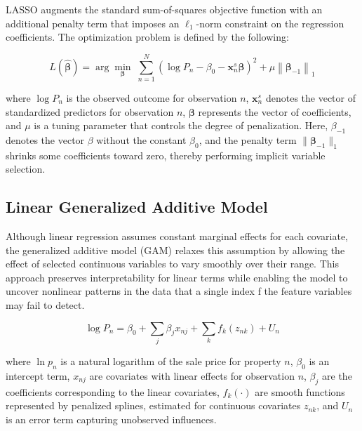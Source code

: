 LASSO augments the standard sum-of-squares objective function with an additional penalty term that imposes an \( \ell_1 \)-norm constraint on the regression coefficients. The optimization problem is defined by the following:

\[
L(\hat{\boldsymbol{\beta}}) = \arg\min_{\boldsymbol\beta}\; \sum_{n=1}^{N} \left( \log P_n - \beta_0 - \mathbf{x}_n^s \boldsymbol \beta \right)^2 + \mu \left\| \boldsymbol\beta_{-1} \right\|_1 
\]

\noindent where \( \log P_n \) is the observed outcome for observation $n$, \( \mathbf{x}_n^s \) denotes the vector of standardized predictors for observation $n$, \( \boldsymbol{\beta} \) represents the vector of coefficients, and \( \mu  \) is a tuning parameter that controls the degree of penalization. Here, $\beta_{-1}$ denotes the vector $\beta$ without the constant $\beta_0$, and the penalty term \( \| \boldsymbol\beta_{-1} \|_1 \) shrinks some coefficients toward zero, thereby performing implicit variable selection. 

\subsection*{Linear Generalized Additive Model}

Although linear regression assumes constant marginal effects for each covariate, the generalized additive model (GAM) relaxes this assumption by allowing the effect of selected continuous variables to vary smoothly over their range. This approach preserves interpretability for linear terms while enabling the model to uncover nonlinear patterns in the data that a single index f the feature variables may fail to detect. 

\[
\log P_n = \beta_0 + \sum_{j} \beta_j x_{nj} + \sum_{k} f_k(z_{nk}) + U_n
\]

\noindent where  \( \ln p_n \) is a natural logarithm of the sale price for property \(n\), \( \beta_0 \) is an intercept term, \( x_{nj} \) are covariates with linear effects for observation \( n \), \( \beta_j \) are the coefficients corresponding to the linear covariates, \( f_k(\cdot) \) are smooth functions represented by penalized splines, estimated for continuous covariates \( z_{nk} \), and \( U_n \) is an error term capturing unobserved influences.
